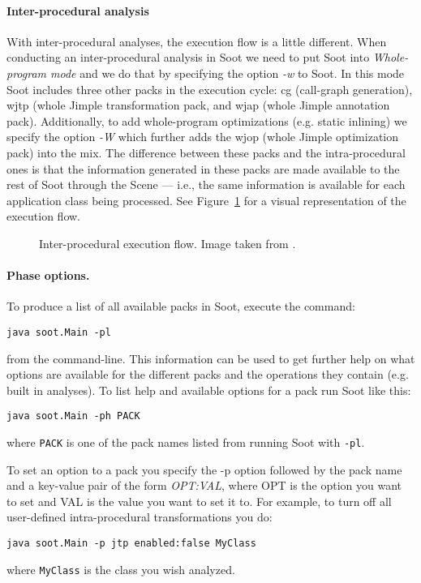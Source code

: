 \documentclass{article}
\newcommand{\code}[1]{\texttt{\small #1}}
\begin{document}
\paragraph{Inter-procedural analysis}

With inter-procedural analyses, the execution flow is a little
different. When conducting an inter-procedural analysis in Soot we
need to put Soot into \emph{Whole-program mode} and we do that by
specifying the option \emph{-w} to Soot. In this mode Soot includes
three other packs in the execution cycle: cg (call-graph generation),
wjtp (whole Jimple transformation pack, and wjap (whole Jimple
annotation pack). Additionally, to add whole-program optimizations
(e.g. static inlining) we specify the option \emph{-W} which further
adds the wjop (whole Jimple optimization pack) into the mix. The
difference between these packs and the intra-procedural ones is that
the information generated in these packs are made available to the
rest of Soot through the Scene --- i.e., the same information is
available for each application class being processed. See
Figure~\ref{fig:interp_packs} for a visual representation of the
execution flow.

\begin{figure}[!htb]
  \centering
  \caption{Inter-procedural execution flow. \footnotesize{Image taken
  from \cite{tutorial}.}}
  \label{fig:interp_packs}
\end{figure}

\paragraph{Phase options.}

To produce a list of all available packs in Soot, execute the command:
\begin{center}
  \code{java soot.Main -pl}
\end{center}
from the command-line. This information can be used to get further
help on what options are available for the different packs and the
operations they contain (e.g. built in analyses). To list help and
available options for a pack run Soot like this:
\begin{center}
  \code{java soot.Main -ph PACK}
\end{center}
where \code{PACK} is one of the pack names listed from running Soot
with \code{-pl}.

To set an option to a pack you specify the -p option followed by the
pack name and a key-value pair of the form \emph{OPT:VAL}, where OPT
is the option you want to set and VAL is the value you want to set it
to. For example, to turn off all user-defined intra-procedural
transformations you do:
\begin{center}
  \code{java soot.Main -p jtp enabled:false MyClass}
\end{center}
where \code{MyClass} is the class you wish analyzed.
\end{document}
